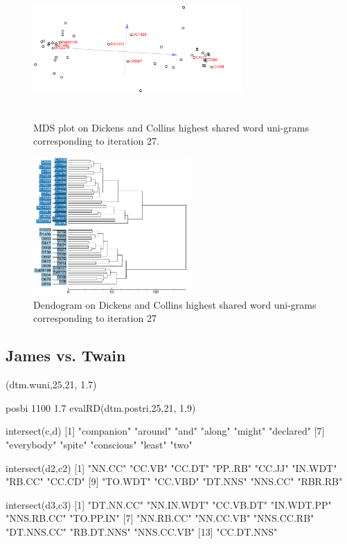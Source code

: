 \documentclass[a4paper,10pt,twoside,fleqn]{article}
\begin{document}
\begin{figure}
\centering
\parbox{8cm}{
\includegraphics[width=8cm,height=4.5cm]{mdsplot/dc-wuni-DC1423.pdf}
\caption{MDS plot on Dickens and Collins highest shared word uni-grams 
corresponding to iteration 27.}
\label{fig:dc-unigram-mdsplot}}
\qquad
\begin{minipage}{6cm}
\includegraphics[width=6cm]{dend/dc-wuni-cl-DC1423.pdf}
\caption{Dendogram on Dickens and Collins highest shared word uni-grams 
corresponding to iteration 27}
\label{fig:dc-unigram-dendo}
\end{minipage}
\end{figure}


\subsection{James vs. Twain} \label{sec:twain-james}




(dtm.wuni,25,21, 1.7)


posbi 1100 1.7 
evalRD(dtm.postri,25,21, 1.9)



intersect(c,d)
 [1] "companion" "around"    "and"       "along"     "might"     "declared" 
 [7] "everybody" "spite"     "conscious" "least"     "two" 



 intersect(d2,c2)
 [1] "NN.CC"  "CC.VB"  "CC.DT"  "PP..RB" "CC.JJ"  "IN.WDT" "RB.CC"  "CC.CD" 
 [9] "TO.WDT" "CC.VBD" "DT.NNS" "NNS.CC" "RBR.RB"

 intersect(d3,c3)
 [1] "DT.NN.CC"  "NN.IN.WDT" "CC.VB.DT"  "IN.WDT.PP" "NNS.RB.CC" "TO.PP.IN" 
 [7] "NN.RB.CC"  "NN.CC.VB"  "NNS.CC.RB" "DT.NNS.CC" "RB.DT.NNS" "NNS.CC.VB"
[13] "CC.DT.NNS"
\end{document}

